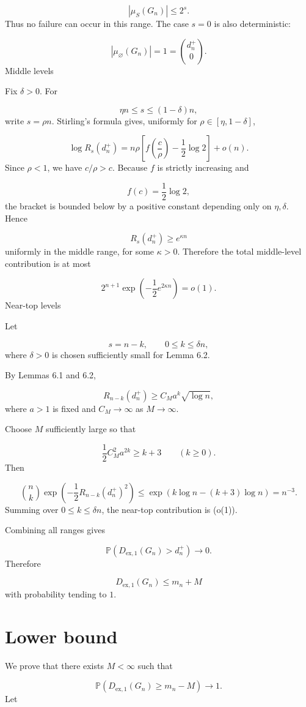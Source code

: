 \documentclass[11pt]{article}
\theoremstyle{definition}
\begin{document}
\[
|\mu_S(G_n)|\le2^s.
\]
Thus no failure can occur in this range. The case $s=0$ is also deterministic:

\[
|\mu_\varnothing(G_n)|=1=\binom{d_n^+}{0}.
\]
Middle levels

Fix $\delta>0$. For

\[
\eta n\le s\le(1-\delta)n,
\]
write $s=\rho n$. Stirling's formula gives, uniformly for $\rho\in[\eta,1-\delta]$,

\[
\log R_s(d_n^+)
=
n\rho
\left[
f\left(\frac c\rho\right)-\frac12\log2
\right]
+
o(n).
\]
Since $\rho<1$, we have $c/\rho>c$. Because $f$ is strictly increasing and

\[
f(c)=\frac12\log2,
\]
the bracket is bounded below by a positive constant depending only on $\eta,\delta$. Hence

\[
R_s(d_n^+)\ge e^{\kappa n}
\]
uniformly in the middle range, for some $\kappa>0$. Therefore the total middle-level contribution is at most

\[
2^{n+1}\exp\left(-\frac12e^{2\kappa n}\right)=o(1).
\]
Near-top levels

Let

\[
s=n-k,
\qquad
0\le k\le\delta n,
\]
where $\delta>0$ is chosen sufficiently small for Lemma 6.2.

By Lemmas 6.1 and 6.2,

\[
R_{n-k}(d_n^+)
\ge
C_M a^k\sqrt{\log n},
\]
where $a>1$ is fixed and $C_M\to\infty$ as $M\to\infty$.

Choose $M$ sufficiently large so that

\[
\frac12C_M^2a^{2k}\ge k+3
\qquad(k\ge0).
\]
Then

\[
\binom nk
\exp\left(-\frac12R_{n-k}(d_n^+)^2\right)
\le
\exp\left(k\log n-(k+3)\log n\right)
=
n^{-3}.
\]
Summing over $0\le k\le\delta n$, the near-top contribution is (o(1)).

Combining all ranges gives

\[
\mathbb{P}\left(
D_{\mathrm{ex},1}(G_n)>d_n^+
\right)\to0.
\]
Therefore

\[
D_{\mathrm{ex},1}(G_n)\le m_n+M
\]
with probability tending to $1$.

\section{Lower bound}
We prove that there exists $M<\infty$ such that

\[
\mathbb{P}\left(
D_{\mathrm{ex},1}(G_n)\ge m_n-M
\right)\to1.
\]
Let
\end{document}
